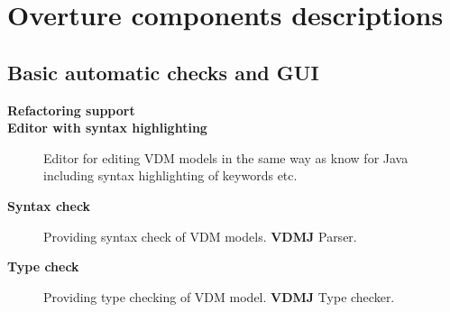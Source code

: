 \documentclass[11pt,a4paper,oneside]{report}
\begin{document}
\chapter{Overture components descriptions}


\section{Basic automatic checks and GUI}
\begin{description}
	\item[\textbf{Refactoring support}] 

	\item[\textbf{Editor with syntax highlighting}] Editor for editing VDM models in the same way as know for Java including syntax highlighting of keywords etc.

	\item[\textbf{Syntax check}] Providing syntax check of VDM models. \textbf{VDMJ} Parser.

	\item[\textbf{Type check}] Providing type checking of VDM model. \textbf{VDMJ} Type checker.

\end{description}
\end{document}
